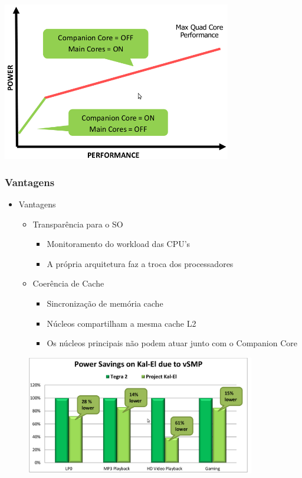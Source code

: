 \documentclass{beamer}
\begin{document}
\begin{frame}
  \centering
  \includegraphics[width=10.0cm]{./pictures/vSMP}
\end{frame}

\subsubsection{Vantagens}
\begin{frame}
  \begin{itemize}
    \item Vantagens
    \begin{itemize}
      \item Transpar\^encia para o SO
      \begin{itemize}
	\item Monitoramento do workload das CPU's
	\item A pr\'opria arquitetura faz a troca dos processadores
      \end{itemize}
      \item Coer\^encia de Cache
      \begin{itemize}
	\item Sincroniza\c{c}\~ao de mem\'oria cache
	\item N\'ucleos compartilham a mesma cache L2
	\item Os n\'ucleos principais n\~ao podem atuar junto com o Companion Core
      \end{itemize}
    \end{itemize}
  \end{itemize}
\end{frame}
  
\begin{frame}
  \begin{figure}
    \centering
    \includegraphics[width=10.0cm]{./pictures/PowerSavesVSMP}
  \end{figure}
\end{frame}
\end{document}
